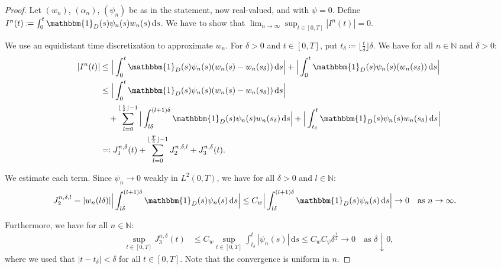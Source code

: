 \documentclass{amsart}
\newcommand{\dd}{\,\mathrm{d}}
\newcommand{\one}{\mathbbm{1}}
\newcommand{\<}{\langle}
\newcommand{\?}{\rangle}
\theoremstyle{plain}
\theoremstyle{remark}
\theoremstyle{plain}
\numberwithin{equation}{section}
\def\N{{\mathbb N}}
\begin{document}
\begin{proof}
Let $(w_n)$, $(\alpha_n)$, $(\psi_n)$  be as in the statement, now real-valued, and with $\psi=0$. Define $I^n(t)\coloneqq \int_0^t \one_D(s)\psi_n(s)w_n(s)\dd s$. We have to show that $\lim_{n\to\infty}\sup_{t\in[0,T]}|I^n(t)|=0$.

We use  an equidistant time discretization to approximate $w_n$.
For $\delta>0$ and $t\in[0,T]$, put $t_\delta\coloneqq \lfloor \frac{t}{\delta}\rfloor\delta$.
We have for all $n\in\N$ and $\delta>0$:
\begin{align}\label{eq: est I_3^n}
 |I^n(t)| &\leq \Big|\int_0^t \one_D(s)\psi_n(s)(w_n(s)-w_n(s_\delta))\dd s\Big|+\Big|\int_0^t \one_D(s)\psi_n(s)(w_n(s_\delta))\dd s\Big|\notag\\
&\leq \Big|\int_0^t \one_D(s)\psi_n(s)(w_n(s)-w_n(s_\delta))\dd s\Big|\notag\\
  &\quad+\sum_{l=0}^{\lfloor \frac{t}{\delta}\rfloor-1}\Big|\int_{l\delta}^{(l+1)\delta} \one_D(s)\psi_n(s)w_n(s_\delta)\dd s\Big|+\Big|\int_{t_\delta}^t \one_D(s)\psi_n(s)w_n(s_\delta)\dd s\Big|\notag\\
  &\eqqcolon  J_1^{n,\delta}(t)+\sum_{l=0}^{\lfloor \frac{T}{\delta}\rfloor-1}J_2^{n,\delta,l}+J_3^{n,\delta}(t).
\end{align}

We estimate each term.
Since $\psi_n\to 0$ weakly in $L^2(0,T)$, we have for all $\delta>0$ and $l\in\N$:
\begin{align}\label{eq: est J_3}
 J_2^{n,\delta,l}&=|w_n(l\delta)|\Big|\int_{l\delta}^{(l+1)\delta} \one_{D}(s)\psi_n(s)\dd s\Big|\leq C_w\Big|\int_{l\delta}^{(l+1)\delta} \one_{D}(s)\psi_n(s)\dd s\Big|\to 0 \quad\text{as } n\to\infty.
\end{align}

Furthermore, we have for all $n\in\N$:
\begin{align}\label{eq: est J_4}
  \sup_{t\in[0,T]}J_3^{n,\delta}(t)
  &\leq C_w \sup_{t\in[0,T]}\int_{t_\delta}^t|\psi_n(s)|\dd s
  \leq C_w C_\psi  \delta^{\frac{1}{2}} \to 0 \quad\text{as } \delta\downarrow 0,
\end{align}
where we used that $|t-t_\delta|<\delta$ for all $t\in[0,T]$. Note that the convergence is uniform in $n$.


\end{proof}
\end{document}
